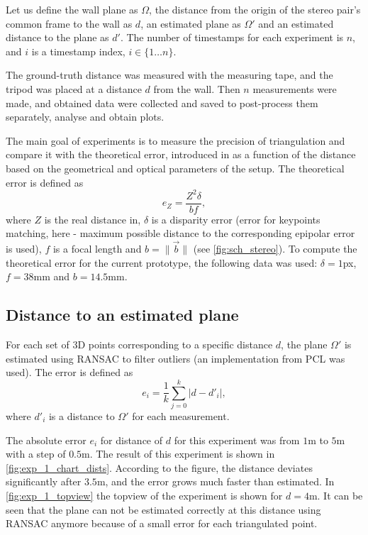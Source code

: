 Let us define the wall plane as $\Omega$, the distance from the origin of the stereo pair's common frame to the wall as $d$, an estimated plane as $\Omega'$ and an estimated distance to the plane as $d'$.
The number of timestamps for each experiment is $n$, and $i$ is a timestamp index, $i \in \{1 \dots n\}$.

The ground-truth distance was measured with the measuring tape, and the tripod was placed at a distance $d$ from the wall. 
Then $n$ measurements were made, and obtained data were collected and saved to post-process them separately, analyse and obtain plots.

The main goal of experiments is to measure the precision of triangulation and compare it with the theoretical error, introduced in \cite{cv_theoretical_error} as a function of the distance based on the geometrical and optical parameters of the setup.
The theoretical error is defined as
\begin{equation}
    e_Z = \frac{Z^2 \delta}{bf},
\end{equation}
where $Z$ is the real distance in, $\delta$ is a disparity error (error for keypoints matching, here - maximum possible distance to the corresponding epipolar error is used), $f$ is a focal length and $b = \lVert \vec{b} \rVert$ (see \autoref{fig:sch_stereo}).
To compute the theoretical error for the current prototype, the following data was used: $\delta=1$px, $f=38$mm and $b=14.5$mm.

\subsection{Distance to an estimated plane}
\label{sec:exp1}
For each set of 3D points corresponding to a specific distance $d$, the plane $\Omega'$ is estimated using RANSAC to filter outliers (an implementation from PCL was used).
The error is defined as
\begin{equation}
    e_i = \frac{1}{k}\sum_{j=0}^{k}{|d - d'_i|},
\end{equation}
where $d'_i$ is a distance to $\Omega'$ for each measurement.

The absolute error $e_i$ for distance of $d$ for this experiment was from $1$m to $5$m with a step of $0.5$m.
The result of this experiment is shown in \autoref{fig:exp_1_chart_dists}.
According to the figure, the distance deviates significantly after $3.5$m, and the error grows much faster than estimated.
In \autoref{fig:exp_1_topview} the topview of the experiment is shown for $d=4$m.
It can be seen that the plane can not be estimated correctly at this distance using RANSAC anymore because of a small error for each triangulated point.

